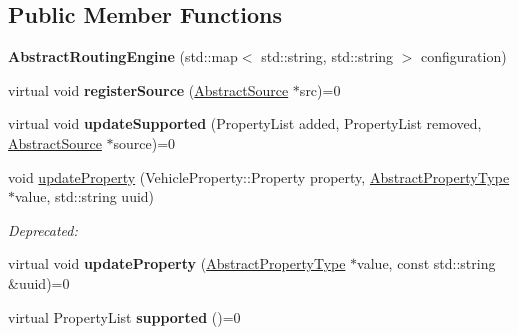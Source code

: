 \subsection*{Public Member Functions}
\begin{DoxyCompactItemize}
\item 
\hypertarget{classAbstractRoutingEngine_a60ef59d81671e74ecc1ba3e926157a7f}{{\bfseries Abstract\+Routing\+Engine} (std\+::map$<$ std\+::string, std\+::string $>$ configuration)}\label{classAbstractRoutingEngine_a60ef59d81671e74ecc1ba3e926157a7f}

\item 
\hypertarget{classAbstractRoutingEngine_ad88ea00def2bb5991f5b2b424acab6c8}{virtual void {\bfseries register\+Source} (\hyperlink{classAbstractSource}{Abstract\+Source} $\ast$src)=0}\label{classAbstractRoutingEngine_ad88ea00def2bb5991f5b2b424acab6c8}

\item 
\hypertarget{classAbstractRoutingEngine_a177588ad6d45f477f596eb025dcc8bed}{virtual void {\bfseries update\+Supported} (Property\+List added, Property\+List removed, \hyperlink{classAbstractSource}{Abstract\+Source} $\ast$source)=0}\label{classAbstractRoutingEngine_a177588ad6d45f477f596eb025dcc8bed}

\item 
\hypertarget{classAbstractRoutingEngine_adadf5f60f3895bdb90bb224d05ee97f0}{void \hyperlink{classAbstractRoutingEngine_adadf5f60f3895bdb90bb224d05ee97f0}{update\+Property} (Vehicle\+Property\+::\+Property property, \hyperlink{classAbstractPropertyType}{Abstract\+Property\+Type} $\ast$value, std\+::string uuid)}\label{classAbstractRoutingEngine_adadf5f60f3895bdb90bb224d05ee97f0}

\begin{DoxyCompactList}\small\item\em Deprecated\+: \end{DoxyCompactList}\item 
\hypertarget{classAbstractRoutingEngine_a2395e520ddfd532959706a5122998fbb}{virtual void {\bfseries update\+Property} (\hyperlink{classAbstractPropertyType}{Abstract\+Property\+Type} $\ast$value, const std\+::string \&uuid)=0}\label{classAbstractRoutingEngine_a2395e520ddfd532959706a5122998fbb}

\item 
\hypertarget{classAbstractRoutingEngine_adcd80e2e3823af7101c5d1f7ff0c217c}{virtual Property\+List {\bfseries supported} ()=0}\label{classAbstractRoutingEngine_adcd80e2e3823af7101c5d1f7ff0c217c}


\end{DoxyCompactItemize}
